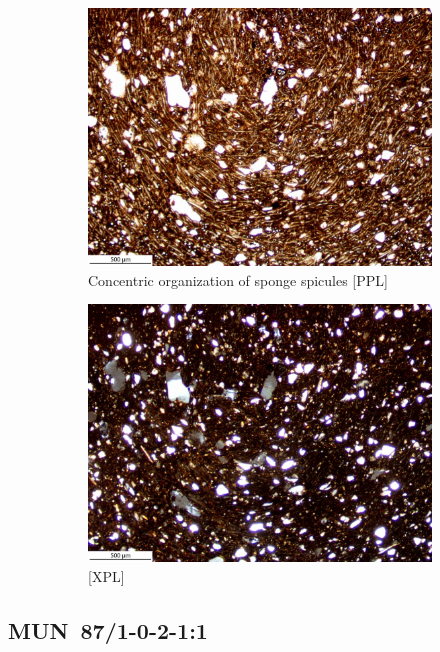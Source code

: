 \documentclass[a4paper]{article}
\begin{document}
\begin{figure}[H]
\begin{subfigure}[t]{.49\textwidth}
		\includegraphics[width=\textwidth]{ThinSections/101-1_4x_PPL.jpg}
		\caption{Concentric organization of sponge spicules [PPL]}
	\end{subfigure}\hspace{.5em}\hfill
	\begin{subfigure}[t]{.49\textwidth}
		\includegraphics[width=\textwidth]{ThinSections/101-1_4x_XPL.jpg}
		\caption{[XPL]}
	\end{subfigure}
	\caption{}
	\label{fig:101_mun}
\end{figure}

\newpage\subsection{MUN~87/1-0-2-1:1 \citep[mun\#109; Fig.~\ref{fig:mun.pottery}.12; Ebambe style;][470 Pl.~89.4]{Seidensticker.2021e}}
\end{document}
